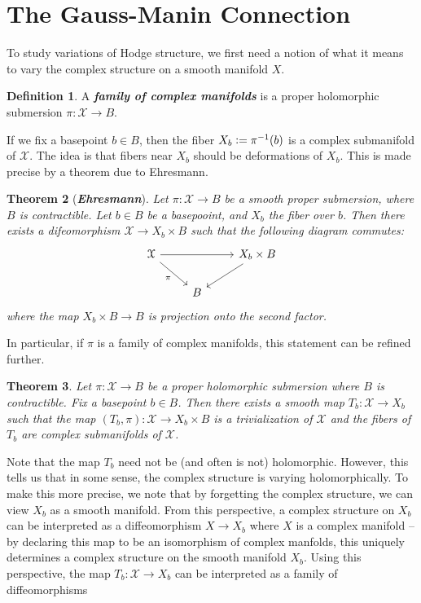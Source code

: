 \documentclass[psamsfonts, 12pt]{amsart}
\newtheorem{thm}{Theorem}[section]
\theoremstyle{definition}
\newtheorem{defn}[thm]{Definition}
\theoremstyle{remark}
\newcommand{\ib}[1]{\textbf{\textit{#1}}}
\newcommand{\inv}{^{-1}}
\newcommand{\defeq}{\vcentcolon=}
\begin{document}
\section{The Gauss-Manin Connection}
%
To study variations of Hodge structure, we first need a notion of what it means to vary
the complex structure on a smooth manifold $X$.
%
\begin{defn}
A \ib{family of complex manifolds} is a proper holomorphic submersion
$\pi : \mathcal{X} \to B$.
\end{defn}
%
If we fix a basepoint $b \in B$, then the fiber $X_b \defeq \pi\inv(b)$ is a
complex submanifold of $\mathcal{X}$. The idea is that fibers near $X_b$ should
be deformations of $X_b$. This is made precise by a theorem due to Ehresmann.
%
\begin{thm}[\ib{Ehresmann}]
Let $\pi : \mathcal{X} \to B$ be a smooth proper submersion, where $B$ is contractible.
Let $b \in B$ be a basepooint, and $X_b$ the fiber over $b$. Then there
exists a difeomorphism $\mathcal{X} \to X_b \times B$ such that the following
diagram commutes:
\[\begin{tikzcd}
\mathcal{X} \ar[dr, "\pi"']\ar[rr] && X_b \times B \ar[dl] \\
& B
\end{tikzcd}\]
where the map $X_b \times B \to B$ is projection onto the second factor.
\end{thm}
%
In particular, if $\pi$ is a family of complex manifolds, this statement
can be refined further.
%
\begin{thm}
Let $\pi : \mathcal{X} \to B$ be a proper holomorphic submersion where $B$ is
contractible. Fix a basepoint $b \in B$. Then there exists a smooth map
$T_b : \mathcal{X} \to X_b$ such that the map
$(T_b,\pi) : \mathcal{X} \to X_b \times B$ is a trivialization of $\mathcal{X}$ and
the fibers of $T_b$ are complex submanifolds of $\mathcal{X}$.
\end{thm}
%
Note that the map $T_b$ need not be (and often is not) holomorphic. However, this
tells us that in some sense, the complex structure is varying holomorphically. To
make this more precise, we note that by forgetting the complex structure, we can view
$X_b$ as a smooth manifold. From this perspective, a complex structure on $X_b$ can be
interpreted as a diffeomorphism $X \to X_b$ where $X$ is a complex manifold -- by
declaring this map to be an isomorphism of complex manfolds, this uniquely determines
a complex structure on the smooth manifold $X_b$. Using this perspective,
the map $T_b : \mathcal{X} \to X_b$ can be interpreted as a family of diffeomorphisms
\end{document}
